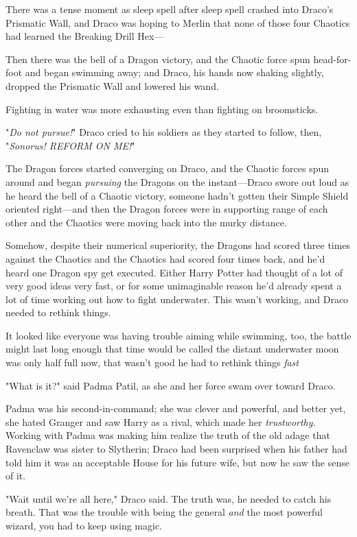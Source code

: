 There was a tense moment as sleep spell after sleep spell crashed into Draco's
Prismatic Wall, and Draco was hoping to Merlin that none of those four Chaotics
had learned the Breaking Drill Hex---

Then there was the bell of a Dragon victory, and the Chaotic force spun
head-for-foot and began swimming away; and Draco, his hands now shaking
slightly, dropped the Prismatic Wall and lowered his wand.

Fighting in water was more exhausting even than fighting on broomsticks.

"\emph{Do not pursue!}" Draco cried to his soldiers as they started to follow,
then, "\emph{Sonorus! REFORM ON ME!}"

The Dragon forces started converging on Draco, and the Chaotic forces spun
around and began \emph{pursuing} the Dragons on the instant---Draco swore out
loud as he heard the bell of a Chaotic victory, someone hadn't gotten their
Simple Shield oriented right---and then the Dragon forces were in supporting
range of each other and the Chaotics were moving back into the murky distance.

Somehow, despite their numerical superiority, the Dragons had scored three
times against the Chaotics and the Chaotics had scored four times back, and
he'd heard one Dragon spy get executed. Either Harry Potter had thought of a
lot of very good ideas very fast, or for some unimaginable reason he'd already
spent a lot of time working out how to fight underwater. This wasn't working,
and Draco needed to rethink things.

It looked like everyone was having trouble aiming while swimming, too, the
battle might last long enough that time would be called{\el} the distant
underwater moon was only half full now, that wasn't good{\el} he had to
rethink things \emph{fast{\el}}

"What is it?" said Padma Patil, as she and her force swam over toward Draco.

Padma was his second-in-command; she was clever and powerful, and better yet,
she hated Granger and saw Harry as a rival, which made her \emph{trustworthy.}
Working with Padma was making him realize the truth of the old adage that
Ravenclaw was sister to Slytherin; Draco had been surprised when his father had
told him it was an acceptable House for his future wife, but now he saw the
sense of it.

"Wait until we're all here," Draco said. The truth was, he needed to catch his
breath. That was the trouble with being the general \emph{and} the most
powerful wizard, you had to keep using magic.

